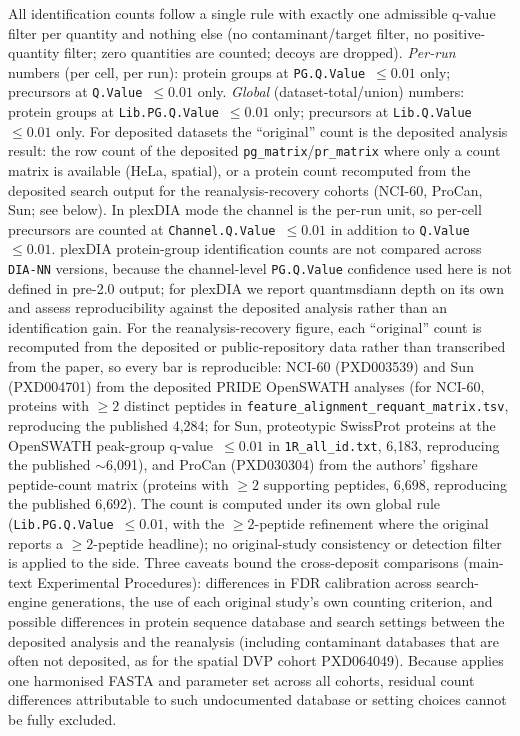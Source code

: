 \documentclass[preprint,12pt]{elsarticle}
\begin{document}
All \quantmsdiann{} identification counts follow a single rule with exactly one admissible q-value filter per quantity and nothing else (no contaminant/target filter, no positive-quantity filter; zero quantities are counted; decoys are dropped). \emph{Per-run} numbers (per cell, per run): protein groups at \texttt{PG.Q.Value}~$\leq 0.01$ only; precursors at \texttt{Q.Value}~$\leq 0.01$ only. \emph{Global} (dataset-total/union) numbers: protein groups at \texttt{Lib.PG.Q.Value}~$\leq 0.01$ only; precursors at \texttt{Lib.Q.Value}~$\leq 0.01$ only. For deposited datasets the ``original'' count is the deposited analysis result: the row count of the deposited \texttt{pg\_matrix}/\texttt{pr\_matrix} where only a count matrix is available (HeLa, spatial), or a protein count recomputed from the deposited search output for the reanalysis-recovery cohorts (NCI-60, ProCan, Sun; see below). In plexDIA mode the channel is the per-run unit, so per-cell precursors are counted at \texttt{Channel.Q.Value}~$\leq 0.01$ in addition to \texttt{Q.Value}~$\leq 0.01$. plexDIA protein-group identification counts are not compared across \texttt{DIA-NN} versions, because the channel-level \texttt{PG.Q.Value} confidence used here is not defined in pre-2.0 output; for plexDIA we report quantmsdiann depth on its own and assess reproducibility against the deposited analysis rather than an identification gain.
For the reanalysis-recovery figure, each ``original'' count is recomputed from the deposited or public-repository data rather than transcribed from the paper, so every bar is reproducible: NCI-60 (PXD003539) and Sun (PXD004701) from the deposited PRIDE OpenSWATH analyses (for NCI-60, proteins with $\geq 2$ distinct peptides in \texttt{feature\_alignment\_requant\_matrix.tsv}, reproducing the published 4{,}284; for Sun, proteotypic SwissProt proteins at the OpenSWATH peak-group q-value~$\leq 0.01$ in \texttt{1R\_all\_id.txt}, 6{,}183, reproducing the published $\sim$6{,}091), and ProCan (PXD030304) from the authors' figshare peptide-count matrix (proteins with $\geq 2$ supporting peptides, 6{,}698, reproducing the published 6{,}692). The \quantmsdiann{} count is computed under its own global rule (\texttt{Lib.PG.Q.Value}~$\leq 0.01$, with the $\geq 2$-peptide refinement where the original reports a $\geq 2$-peptide headline); no original-study consistency or detection filter is applied to the \quantmsdiann{} side. Three caveats bound the cross-deposit comparisons (main-text Experimental Procedures): differences in FDR calibration across search-engine generations, the use of each original study's own counting criterion, and possible differences in protein sequence database and search settings between the deposited analysis and the reanalysis (including contaminant databases that are often not deposited, as for the spatial DVP cohort PXD064049). Because \quantmsdiann{} applies one harmonised FASTA and parameter set across all cohorts, residual count differences attributable to such undocumented database or setting choices cannot be fully excluded.
\end{document}
